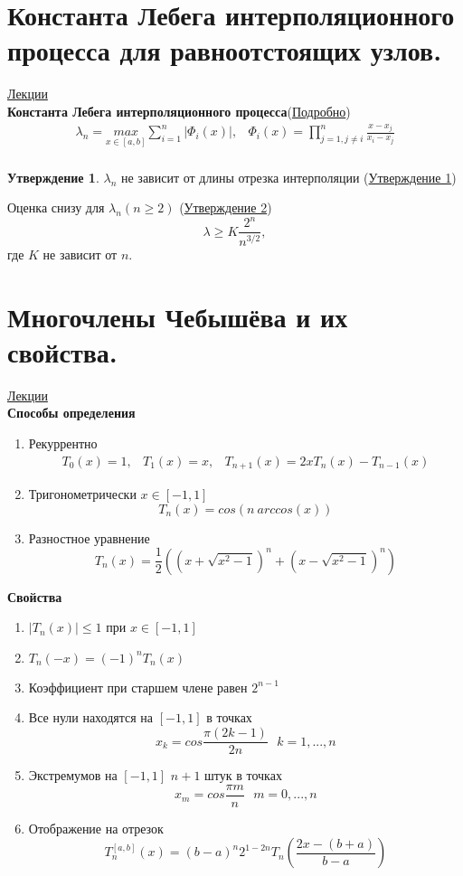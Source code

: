 \documentclass[specialist, subf, href, colorlinks=true, 12pt, times, mtpro, final]{disser}
\theoremstyle{definition}
\newtheorem{state}{Утверждение}[section]
\begin{document}
\section {Константа Лебега интерполяционного процесса для равноотстоящих узлов.}
	\hyperlink {lects.17}{Лекции}\\
	\textbf{Константа Лебега интерполяционного процесса}(\hyperlink {lects.17}{Подробно})
	$$
		\begin{array}{lr}
		\lambda_n = \underset{x\in [a,b]}{max} \sum\limits_{i = 1}^n |\Phi_i(x)|, & \Phi_i(x) = \prod\limits_{j = 1, j\ne i}^{n} \frac{x-x_j}{x_i - x_j} \\
		\end{array}
	$$
	
	\begin{state}
	$\lambda_n$ не зависит от длины отрезка интерполяции (\hyperlink {lects.17}{Утверждение 1})
	\end{state}
	
	Оценка снизу  для $\lambda_n (n \ge 2)$ (\hyperlink {lects.17}{Утверждение 2})
	$$
		\lambda \ge K \frac {2^n}{n^{3/2}}, 
	$$ 
	где $K$ не зависит от $n$. \\
	

\section {Многочлены Чебышёва и их свойства.}
	\hyperlink {lects.18}{Лекции}\\
	\textbf{Способы определения}
	\begin{enumerate}
		\item Рекуррентно 
			  $$
			  	\begin{array}{lcr}
			  		T_0(x) = 1, & T_1(x) = x, & T_{n+1}(x) = 2xT_n(x) - T_{n-1}(x)
			  	\end{array}
			  $$
		\item Тригонометрически $x\in[-1,1]$
			  $$
			  	T_n(x) = cos(n \ arccos(x))
			  $$
		\item Разностное уравнение
			  $$
			  	T_n(x) = \frac{1}{2}\left( \left( x + \sqrt{x^2 - 1} \right)^n + \left( x - \sqrt{x^2 - 1} \right)^n \right)
			  $$
	\end{enumerate}
	\textbf{Свойства}
	\begin{enumerate}
		\item $|T_n(x)| \le 1$ при $x \in [-1,1]$
		\item $T_n(-x) = (-1)^nT_n(x)$
		\item Коэффициент при старшем члене равен $2^{n - 1}$
		\item Все нули находятся на $[-1,1]$ в точках
			$$
				x_k = cos \frac{\pi (2k -1)}{2n} \ \ \ k = 1, ... , n
			$$
		\item Экстремумов на $[-1,1]$ $n+1$ штук в точках
			$$
				x_m = cos \frac{\pi m}{n} \ \ \ m = 0, ... , n
			$$ 
		\item Отображение на отрезок 
			$$
				T_n^{[a,b]} (x) = (b - a)^n 2^{1-2n} T_n \left( \frac{2x - (b+a)}{b-a} \right)
			$$
	\end{enumerate}
\end{document}

